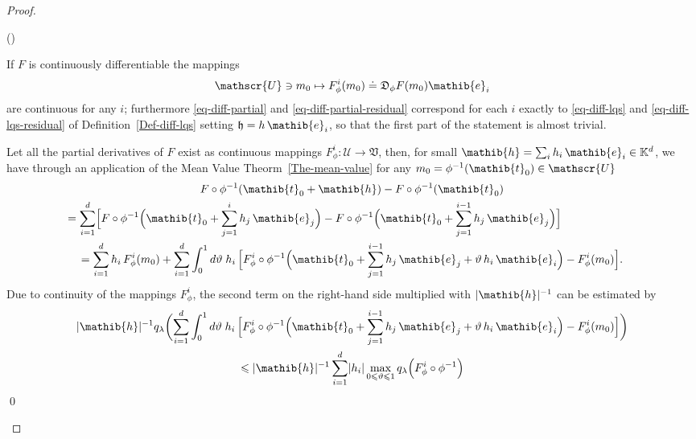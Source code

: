 \documentclass[11pt,twoside,openright]{report}
\theoremstyle{definition}
\theoremstyle{plain}
\theoremstyle{remark}
\theoremstyle{assumption}
\newcommand{\abs}[1]{\lvert #1 \rvert}
\newcommand{\Bqlx}[1]{q_\lambda \Bigl( #1 \Bigr)}
\newcommand{\bgqlx}[1]{q_\lambda \biggl( #1 \biggr)}
\newcommand{\Kbb}{\mathbb{K}}
\newcommand{\Dfrak}{\mathfrak{D}}
\newcommand{\Vfrak}{\mathfrak{V}}
\newcommand{\hfrak}{\mathfrak{h}}
\newcommand{\eib}{\mathib{e}}
\newcommand{\hib}{\mathib{h}}
\newcommand{\tib}{\mathib{t}}
\newcommand{\Uscr}{\mathscr{U}}
\newcounter{proofitem}
\newenvironment{prooflist}{\begin{list}{(\roman{proofitem})}%
  {\usecounter{proofitem} \setlength{\topsep}{0ex}%
   \setlength{\parsep}{0.2ex} \setlength{\itemsep}{0.4ex}%
   \setlength{\leftmargin}{0em} \setlength{\itemindent}{0.5em}%
   \setlength{\listparindent}{1em}}}{\qed \end{list}}
\begin{document}
\begin{proof}
  \begin{prooflist}
  \item If $F$ is continuously differentiable the mappings 
    \begin{equation}
      \label{eq-diff-partial-derivatives}
      \Uscr \ni m_0 \mapsto F_\phi^i ( m_0 ) \doteq \Dfrak_\phi F (
      m_0) \eib_i 
    \end{equation}
    are continuous for any $i$; furthermore \eqref{eq-diff-partial}
    and \eqref{eq-diff-partial-residual} correspond for each $i$
    exactly to \eqref{eq-diff-lqs} and \eqref{eq-diff-lqs-residual} of
    Definition~\ref{Def-diff-lqs} setting $\hfrak = h \, \eib_i$, so
    that the first part of the statement is almost trivial. 
  \item Let all the partial derivatives of $F$ exist as continuous
    mappings $F_\phi^i : \Uscr \rightarrow \Vfrak$, then, for small
    $\hib = \sum_i h_i \, \eib_i \in \Kbb^d$, we have through an
    application of the Mean Value Theorm~\ref{The-mean-value} for any
    $m_0 = \phi^{-1} ( \tib_0 ) \in \Uscr$  
    \begin{multline}
      \label{eq-first-appl-mean-value}
      F \circ \phi^{-1} ( \tib_0 + \hib ) - F \circ \phi^{-1} ( \tib_0
      ) \\ 
      \mspace{-120mu} = \sum_{i = 1}^d \Bigl[ F \circ \phi^{-1}
      \Bigl( \tib_0 + \sum_{j = 1}^i h_j \, \eib_j \Bigr) - F \circ
      \phi^{-1} \Bigl( \tib_0 + \sum_{j = 1}^{i - 1} h_j \, \eib_j
      \Bigr) \Bigr] \\ 
      = \sum_{i = 1}^d h_i \, F_\phi^i ( m_0 ) + \sum_{i = 1}^d
      \int_0^1 d \vartheta \; h_i \, \Bigl[ F_\phi^i \circ \phi^{-1}
      \Bigl( \tib_0 + \sum_{j = 1}^{i - 1} h_j \, \eib_j + \vartheta
      \, h_i \, \eib_i \Bigr) - F_\phi^i ( m_0 ) \Bigr] \text{.}
    \end{multline}
    Due to continuity of the mappings $F_\phi^i$, the second term on
    the right-hand side multiplied with $\abs{\hib}^{-1}$ can be
    estimated by
    \begin{multline}
      \label{eq-first-appl-mean-value-residual}
      \abs{\hib}^{-1} \bgqlx{\sum_{i = 1}^d \int_0^1 d \vartheta \;
      h_i \, \Bigl[ F_\phi^i \circ \phi^{-1} \Bigl( \tib_0 + \sum_{j =
      1}^{i - 1} h_j \, \eib_j + \vartheta \, h_i \, \eib_i \Bigr) -
      F_\phi^i ( m_0 ) \Bigr]} \\
      \leqslant \abs{\hib}^{-1} \sum_{i = 1}^d \abs{h_i} \max_{0
      \leqslant \vartheta \leqslant 1} \Bqlx{F_\phi^i \circ \phi^{-1}
}
\end{multline}
\end{prooflist}
\end{proof}
\end{document}
